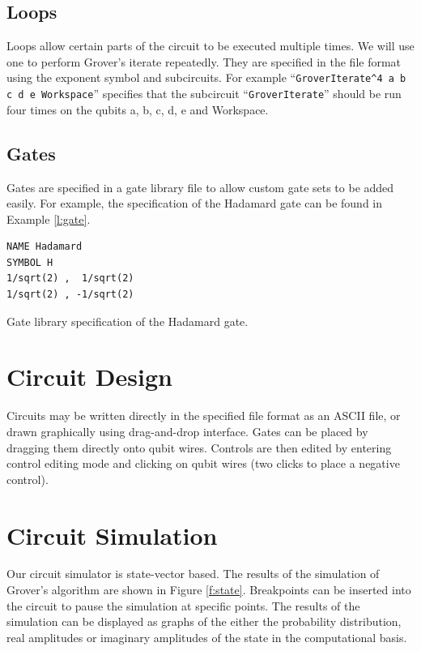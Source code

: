 \documentclass[aps,prl,reprint,floatfix,superscriptaddress]{revtex4-1} %
\begin{document}
\subsection{Loops}
Loops allow certain parts of the circuit to be executed multiple times. We will use one to perform Grover's iterate repeatedly. They are specified in the file format
using the exponent symbol and subcircuits. For example ``\verb+GroverIterate^4 a b c d e Workspace+'' specifies that the subcircuit ``\verb+GroverIterate+'' %
should be run four times on the qubits a, b, c, d, e and Workspace.
\subsection{Gates}
Gates are specified in a gate library file to allow custom gate sets to be added easily. For example, the specification of the Hadamard gate
can be found in Example \ref{l:gate}.
\begin{program}
\begin{verbatim}
NAME Hadamard
SYMBOL H
1/sqrt(2) ,  1/sqrt(2)
1/sqrt(2) , -1/sqrt(2)
\end{verbatim}
\caption{Gate library specification of the Hadamard gate.}
\label{l:gate}
\end{program}

\section{Circuit Design}
Circuits may be written directly in the specified file format as an ASCII file, or drawn graphically using drag-and-drop interface.  Gates can be placed %
by dragging them directly onto qubit wires.
Controls are then edited by entering control editing mode and clicking on qubit wires (two clicks to place a negative control).

\section{Circuit Simulation}
Our circuit simulator is state-vector based. The results of the simulation of Grover's algorithm are shown in Figure \ref{f:state}. Breakpoints can be inserted into the circuit to pause the simulation at specific points.  The results of the simulation can be displayed as graphs of the either the probability distribution, real amplitudes or imaginary amplitudes of the state in the computational basis.
\end{document}
